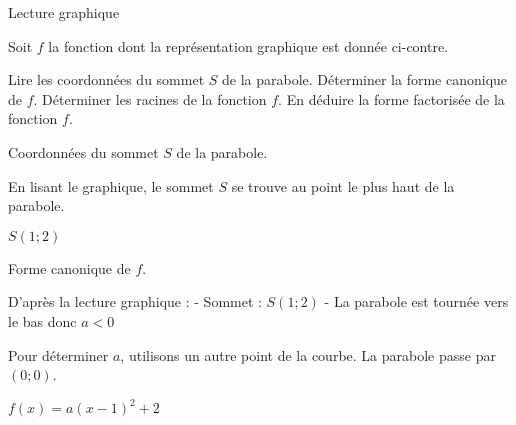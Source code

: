 \begin{EXO}{Lecture graphique}{}%

\begin{MultiColonnes}{3}
\tcbitem[raster multicolumn=2] Soit $f$ la fonction dont la représentation graphique est donnée ci-contre. 

\begin{tcbenumerate}
\tcbitem {}Lire les coordonnées du sommet $S$ de la parabole.
\tcbitem {}Déterminer la forme canonique de $f$.
\tcbitem {}Déterminer les racines de la fonction $f$.
\tcbitem {}En déduire la forme factorisée de la fonction $f$.
\end{tcbenumerate}

\tcbitem[halign=center,valign=center] 
\end{MultiColonnes}
\exocorrection

\begin{tcbenumerate}[2]
\tcbitem Coordonnées du sommet $S$ de la parabole.

En lisant le graphique, le sommet $S$ se trouve au point le plus haut de la parabole.

$S(1 ; 2)$

\tcbitem Forme canonique de $f$.

D'après la lecture graphique :
- Sommet : $S(1 ; 2)$
- La parabole est tournée vers le bas donc $a < 0$

Pour déterminer $a$, utilisons un autre point de la courbe.
La parabole passe par $(0 ; 0)$.

$f(x) = a(x-1)^2 + 2$


\end{tcbenumerate}
\end{EXO}
